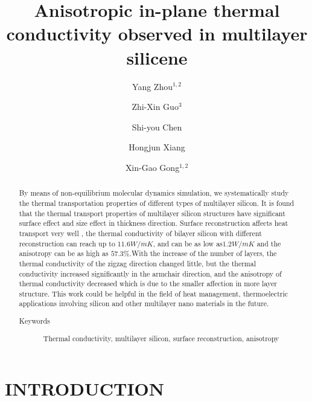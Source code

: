 \documentclass[%
 reprint,
 amsmath,amssymb,
 aps,
 prb,
]{revtex4-1}
\begin{document}
\title{Anisotropic in-plane thermal conductivity observed in multilayer silicene}
\author{Yang Zhou${}^{1,2}$}
\author{Zhi-Xin Guo${}^{3}$}
\author{Shi-you Chen}
\author{Hongjun Xiang}
\author{Xin-Gao Gong${}^{1,2}$}
\begin{abstract}
By means of non-equilibrium molecular dynamics simulation, we systematically study the thermal transportation properties of different types of multilayer silicon. It is found that the thermal transport properties of multilayer silicon structures have significant surface effect and size effect in thickness direction. Surface reconstruction affects heat transport very well , the thermal conductivity of bilayer silicon with different reconstruction can reach up to $11.6 W/mK$, and can be as low as$ 1.2 W/mK$ and the anisotropy can be as high as $57.3\%$.With the increase of the number of layers, the thermal conductivity of the zigzag direction changed little, but the thermal conductivity increased significantly in the armchair direction, and the anisotropy of thermal conductivity decreased which is due to the smaller affection in more layer structure. This work could be helpful in the field of heat management, thermoelectric applications involving silicon and other multilayer nano materials in the future.
\begin{description}
\item[Keywords]
Thermal conductivity, multilayer silicon, surface reconstruction, anisotropy
\end{description}
\end{abstract}

\maketitle

\section{INTRODUCTION}
\end{document}
